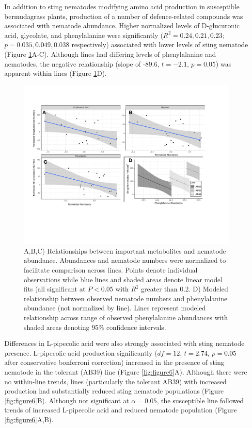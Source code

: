 \documentclass[fleqn,10pt]{wlscirep}
\begin{document}
In addition to sting nematodes modifying amino acid production in susceptible bermudagrass plants, production of a number of defence-related compounds was associated with nematode abundance.  Higher normalized levels of D-glucuronic acid, glycolate, and phenylalanine were significantly ($R^2 = 0.24, 0.21, 0.23$; $p = 0.035, 0.049, 0.038$ respectively) associated with lower levels of sting nematode (Figure \ref{fig:figure5}A-C).  Although lines had differing levels of phenylalanine and nematodes, the negative relationship (slope of -89.6, $t = -2.1$, $p = 0.05$) was apparent within lines (Figure \ref{fig:figure5}D).  

\begin{figure}
\includegraphics[width = 0.95\linewidth]{figures/publication_figures/figure-5.pdf}
\caption{A,B,C) Relationships between important metabolites and nematode abundance.  Abundances and nematode numbers were normalized to facilitate comparison across lines.  Points denote individual observations while blue lines and shaded areas denote linear model fits (all significant at $P < 0.05$ with $R^2$ greater than 0.2.  D) Modeled relationship between observed nematode numbers and phenylalanine abundance (not normalized by line).  Lines represent modeled relationship across range of observed phenylalanine abundances with shaded areas denoting 95\% confidence intervals. }
\label{fig:figure5}
\end{figure}

Differences in L-pipecolic acid were also strongly associated with sting nematode presence. L-pipecolic acid production significantly ($df = 12$, $t = 2.74$, $p = 0.05$ after conservative bonferroni correction) increased in the presence of sting nematode in the tolerant (AB39) line (Figure \ref{fig:figure6}A).  Although there were no within-line trends, lines (particularly the tolerant AB39) with increased production had substantially reduced sting nematode populations (Figure \ref{fig:figure6}B). Although not significant at $\alpha = 0.05$, the susceptible line followed trends of increased L-pipecolic acid and reduced nematode population (Figure \ref{fig:figure6}A,B). 
\end{document}
